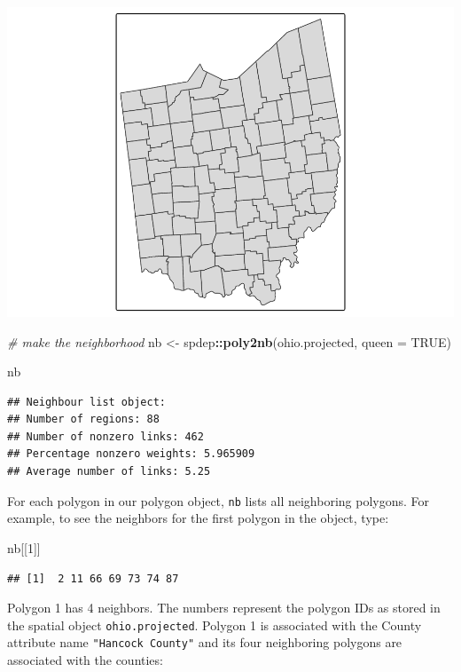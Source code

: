 \documentclass[]{article}
\newenvironment{Shaded}{\begin{snugshade}}{\end{snugshade}}
\newcommand{\AttributeTok}[1]{\textcolor[rgb]{0.13,0.29,0.53}{#1}}
\newcommand{\CommentTok}[1]{\textcolor[rgb]{0.56,0.35,0.01}{\textit{#1}}}
\newcommand{\ConstantTok}[1]{\textcolor[rgb]{0.56,0.35,0.01}{#1}}
\newcommand{\DecValTok}[1]{\textcolor[rgb]{0.00,0.00,0.81}{#1}}
\newcommand{\FunctionTok}[1]{\textcolor[rgb]{0.13,0.29,0.53}{\textbf{#1}}}
\newcommand{\NormalTok}[1]{#1}
\newcommand{\OtherTok}[1]{\textcolor[rgb]{0.56,0.35,0.01}{#1}}
\newcommand{\SpecialCharTok}[1]{\textcolor[rgb]{0.81,0.36,0.00}{\textbf{#1}}}
\begin{document}
\includegraphics{lab03_files/figure-latex/make some neighbors-1.pdf}

\begin{Shaded}
\begin{Highlighting}[]
\CommentTok{\# make the neighborhood}
\NormalTok{nb }\OtherTok{\textless{}{-}}\NormalTok{ spdep}\SpecialCharTok{::}\FunctionTok{poly2nb}\NormalTok{(ohio.projected, }\AttributeTok{queen =} \ConstantTok{TRUE}\NormalTok{)}

\NormalTok{nb}
\end{Highlighting}
\end{Shaded}

\begin{verbatim}
## Neighbour list object:
## Number of regions: 88 
## Number of nonzero links: 462 
## Percentage nonzero weights: 5.965909 
## Average number of links: 5.25
\end{verbatim}

For each polygon in our polygon object, \texttt{nb} lists all
neighboring polygons. For example, to see the neighbors for the first
polygon in the object, type:

\begin{Shaded}
\begin{Highlighting}[]
\NormalTok{nb[[}\DecValTok{1}\NormalTok{]]}
\end{Highlighting}
\end{Shaded}

\begin{verbatim}
## [1]  2 11 66 69 73 74 87
\end{verbatim}

Polygon 1 has 4 neighbors. The numbers represent the polygon IDs as
stored in the spatial object \texttt{ohio.projected}. Polygon 1 is
associated with the County attribute name \texttt{"Hancock\ County"} and
its four neighboring polygons are associated with the counties:
\end{document}
